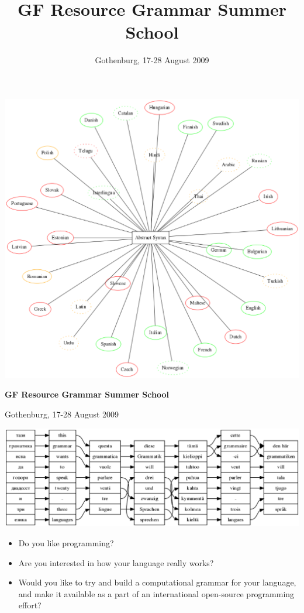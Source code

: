 \documentclass[12pt]{article}
\title{GF Resource Grammar Summer School}
\author{Gothenburg, 17-28 August 2009}
\begin{document}
\begin{center}
\includegraphics{summer-langs.png}

\vspace{6mm}

{\Large\bf GF Resource Grammar Summer School}

\vspace{2mm}

Gothenburg, 17-28 August 2009

\vspace{6mm}

\includegraphics{summer-align.png}
\end{center}

\newpage

\begin{itemize}
\item Do you like programming? 
\item Are you interested in how your language really works? 
\item Would you like to try and build a computational grammar for your language, 
  and make it available as a part of an international open-source 
  programming effort? 
\end{itemize}
\end{document}
